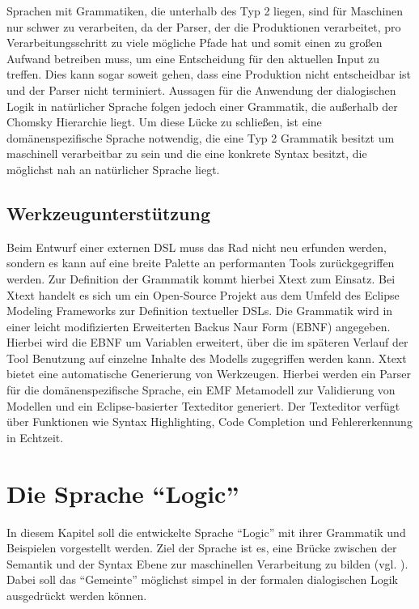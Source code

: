 \documentclass[11pt,a4paper,bibtotocnumbered]{scrreprt}
\begin{document}
Sprachen mit Grammatiken, die unterhalb des Typ 2 liegen, sind für Maschinen nur schwer zu verarbeiten, da der Parser, der die Produktionen verarbeitet, pro Verarbeitungsschritt zu viele mögliche Pfade hat und somit einen zu großen Aufwand betreiben muss, um eine Entscheidung für den aktuellen Input zu treffen. Dies kann sogar soweit gehen, dass eine Produktion nicht entscheidbar ist und der Parser nicht terminiert.
Aussagen für die Anwendung der dialogischen Logik in natürlicher Sprache folgen jedoch einer Grammatik, die außerhalb der Chomsky Hierarchie liegt. Um diese Lücke zu schließen, ist eine domänenspezifische Sprache notwendig, die eine Typ 2 Grammatik besitzt um maschinell verarbeitbar zu sein und die eine konkrete Syntax besitzt, die möglichst nah an natürlicher Sprache liegt.

\section{Werkzeugunterstützung}
Beim Entwurf einer externen DSL muss das Rad nicht neu erfunden werden, sondern es kann auf eine breite Palette an performanten Tools zurückgegriffen werden. Zur Definition der Grammatik kommt hierbei Xtext zum Einsatz. Bei Xtext handelt es sich um ein Open-Source Projekt aus dem Umfeld des Eclipse Modeling Frameworks zur Definition textueller DSLs.
Die Grammatik wird in einer leicht modifizierten Erweiterten Backus Naur Form (EBNF) angegeben. Hierbei wird die EBNF um Variablen erweitert, über die im späteren Verlauf der Tool Benutzung auf einzelne Inhalte des Modells zugegriffen werden kann. Xtext bietet eine automatische Generierung von Werkzeugen. Hierbei werden ein Parser für die domänenspezifische Sprache, ein EMF Metamodell zur Validierung von Modellen und ein Eclipse-basierter Texteditor generiert. Der Texteditor verfügt über Funktionen wie Syntax Highlighting, Code Completion und Fehlererkennung in Echtzeit.

\chapter{Die Sprache \enquote{Logic}} %

In diesem Kapitel soll die entwickelte Sprache \enquote{Logic} mit ihrer Grammatik und Beispielen vorgestellt werden.
Ziel der Sprache ist es, eine Brücke zwischen der Semantik und der Syntax Ebene zur maschinellen Verarbeitung zu bilden (vgl. \cite[Folie 11]{OrtnerDL}).
Dabei soll das \enquote{Gemeinte} möglichst simpel in der formalen dialogischen Logik ausgedrückt werden können.
\end{document}
